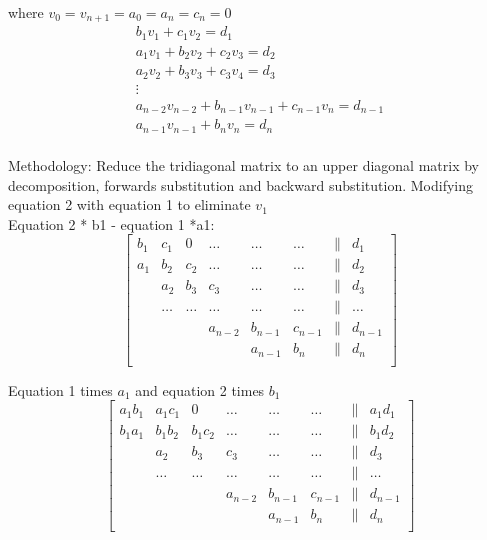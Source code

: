 where
$v_0 = v_{n+1} = a_0 = a_{n} = c_n = 0$\\

\begin{gather*}
   b_1 v_1 + c_1 v_{2} = d_1\\
   a_{1} v_{1} + b_2 v_2 + c_2 v_{3} = d_2\\
   a_{2} v_{2} + b_3 v_3 + c_3 v_{4} = d_3\\
   \vdots\\
   a_{n-2} v_{n-2} + b_{n-1} v_{n-1} + c_{n-1} v_{n} = d_{n-1}\\
   a_{n-1} v_{n-1}+b_{n} v_{n} = d_{n}\\
\end{gather*}

Methodology: Reduce the tridiagonal matrix to an upper diagonal matrix by decomposition, forwards substitution and backward substitution.
Modifying equation 2 with equation 1 to eliminate $v_1$\\
Equation 2 * b1 - equation 1 *a1: \\

\[
\begin{bmatrix}
     b_1 & c_1     & 0     & \dots    & \dots   & \dots    & \| & d_1 \\
     a_1 & b_2     & c_2   & \dots    & \dots   & \dots    & \| & d_2 \\
         & a_2     & b_3   & c_3      & \dots   & \dots    & \| & d_3 \\
         & \dots   & \dots & \dots    & \dots   & \dots    & \| & \dots \\
         &         &       & a_{n-2}  & b_{n-1} & c_{n-1}  & \| & d_{n-1} \\
         &         &       &          & a_{n-1} & b_n      & \| & d_n \\
\end{bmatrix}  
\]

Equation 1 times $a_1$ and equation 2 times $b_1$\\
\[
\begin{bmatrix}
     a_1 b_1 & a_1 c_1     & 0     & \dots    & \dots   & \dots    & \| & a_1 d_1 \\
     b_1 a_1 & b_1 b_2     & b_1 c_2   & \dots    & \dots   & \dots    & \| & b_1 d_2 \\
         & a_2     & b_3   & c_3      & \dots   & \dots    & \| & d_3 \\
         & \dots   & \dots & \dots    & \dots   & \dots    & \| & \dots \\
         &         &       & a_{n-2}  & b_{n-1} & c_{n-1}  & \| & d_{n-1} \\
         &         &       &          & a_{n-1} & b_n      & \| & d_n \\
\end{bmatrix}  
\]

